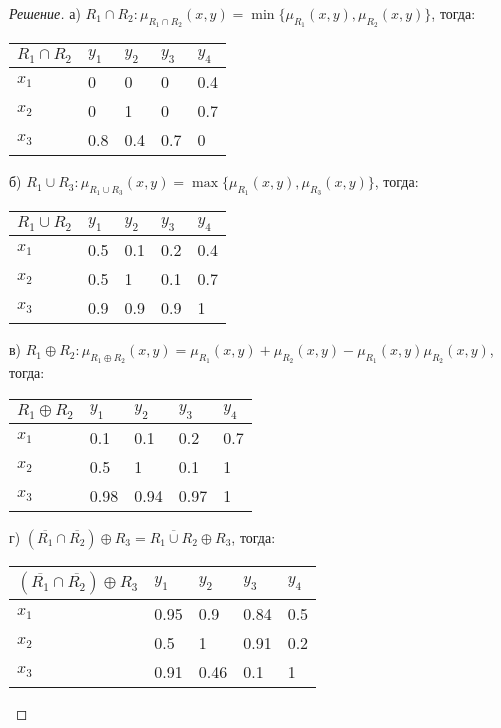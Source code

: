 \documentclass[11pt,a4paper,oneside]{article}
\newenvironment{solution}{
	\begin{proof}[Решение]
		\vspace{-8px}
		\setlength{\parskip}{4px}
		\setlength{\parindent}{0px}
	}{
	\end{proof}
}
\begin{document}
	\begin{solution}
		а) $R_1 \cap R_2: \mu_{R_1 \cap R_2}(x,y) = \min\{\mu_{R_1}(x,y), \mu_{R_2}(x,y)\}$, тогда:
		\begin{table}[!hbtp]
			\begin{tabular}{|l|l|l|l|l|}
				\hline
				$R_1 \cap R_2$ & $y_1$ & $y_2$ & $y_3$ & $y_4$ \\ \hline
				$x_1$ & 0     & 0   & 0     & 0.4   \\ \hline
				$x_2$ & 0   & 1     & 0     & 0.7   \\ \hline
				$x_3$ & 0.8   & 0.4   & 0.7   & 0     \\ \hline
			\end{tabular}
		\end{table}
	
		б) $R_1 \cup R_3: \mu_{R_1 \cup R_3}(x,y) = \max\{\mu_{R_1}(x,y), \mu_{R_3}(x,y)\}$, тогда:
		\begin{table}[!hbtp]
			\begin{tabular}{|l|l|l|l|l|}
				\hline
				$R_1 \cup R_2$ & $y_1$ & $y_2$ & $y_3$ & $y_4$ \\ \hline
				$x_1$ & 0.5     & 0.1   & 0.2     & 0.4   \\ \hline
				$x_2$ & 0.5   & 1     & 0.1     & 0.7   \\ \hline
				$x_3$ & 0.9   & 0.9   & 0.9 & 1     \\ \hline
			\end{tabular}
		\end{table}
	
		в) $ R_1 \oplus R_2 : \mu_{R_1 \oplus R_2}(x,y) = \mu_{R_1}(x,y) + \mu_{R_2}(x,y) - \mu_{R_1}(x,y)\mu_{R_2}(x,y) $, тогда:
		\begin{table}[!hbtp]
			\begin{tabular}{|l|l|l|l|l|}
				\hline
				$R_1 \oplus R_2$ & $y_1$ & $y_2$ & $y_3$ & $y_4$ \\ \hline
				$x_1$ & 0.1     & 0.1   & 0.2     & 0.7    \\ \hline
				$x_2$ & 0.5   & 1     & 0.1     & 1  \\ \hline
				$x_3$ & 0.98   & 0.94   & 0.97 & 1     \\ \hline
			\end{tabular}
		\end{table}
	
		\newpage
		г) $(\overline{R_1} \cap \overline{R_2}) \oplus R_3 = \overline{R_1 \cup R_2} \oplus R_3$, тогда:
		\begin{table}[!hbtp]
			\begin{tabular}{|l|l|l|l|l|}
				\hline
				$(\overline{R_1} \cap \overline{R_2}) \oplus R_3$ & $y_1$ & $y_2$ & $y_3$ & $y_4$ \\ \hline
				$x_1$ & 0.95     & 0.9   & 0.84     & 0.5   \\ \hline
				$x_2$ & 0.5   & 1     & 0.91     & 0.2   \\ \hline
				$x_3$ & 0.91   & 0.46   & 0.1   & 1     \\ \hline
			\end{tabular}
		\end{table}
	
	\end{solution}
\end{document}
